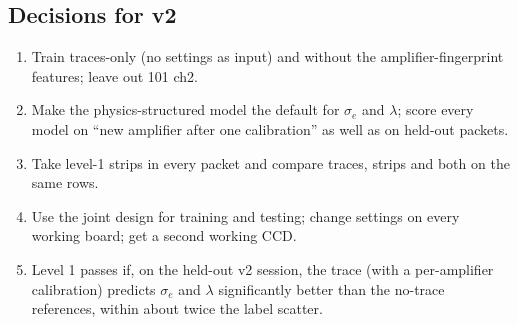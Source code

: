 \documentclass[11pt]{article}
\begin{document}
\subsection{Decisions for v2}
\begin{enumerate}
\item Train traces-only (no settings as input) and without the amplifier-fingerprint features; leave out 101 ch2.
\item Make the physics-structured model the default for $\sigma_e$ and $\lambda$; score every model on ``new amplifier
  after one calibration'' as well as on held-out packets.
\item Take level-1 strips in every packet and compare traces, strips and both on the same rows.
\item Use the joint design for training and testing; change settings on every working board; get a second working CCD.
\item Level 1 passes if, on the held-out v2 session, the trace (with a per-amplifier calibration) predicts $\sigma_e$
  and $\lambda$ significantly better than the no-trace references, within about twice the label scatter.
\end{enumerate}
\end{document}
